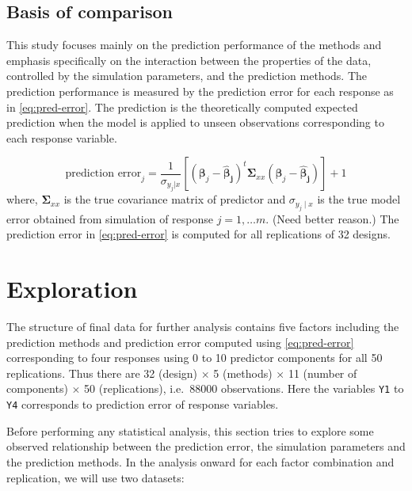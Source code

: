 \documentclass[12pt,3p,authoryear]{elsarticle}
\begin{document}
\hypertarget{basis-of-comparison}{%
\subsection{Basis of comparison}\label{basis-of-comparison}}

This study focuses mainly on the prediction performance of the methods
and emphasis specifically on the interaction between the properties of
the data, controlled by the simulation parameters, and the prediction
methods. The prediction performance is measured by the prediction error
for each response as in \eqref{eq:pred-error}. The prediction is the
theoretically computed expected prediction when the model is applied to
unseen observations corresponding to each response variable.

\begin{equation}
\text{prediction error}_j = \frac{1}{\sigma_{y_j|x}}\left[\left(\boldsymbol{\beta}_j - \boldsymbol{\hat{\beta}_j}\right)^t\boldsymbol{\Sigma}_{xx}\left(\boldsymbol{\beta}_j - \boldsymbol{\hat{\beta}_j}\right)\right] + 1
\label{eq:pred-error}
\end{equation} where, \(\boldsymbol{\Sigma}_{xx}\) is the true
covariance matrix of predictor and \(\sigma_{y_j\mid x}\) is the true
model error obtained from simulation of response \(j = 1, \ldots m\).
(\alert{Need better reason.}) The prediction error in
\eqref{eq:pred-error} is computed for all replications of 32 designs.

\hypertarget{exploration}{%
\section{Exploration}\label{exploration}}

The structure of final data for further analysis contains five factors
including the prediction methods and prediction error computed using
\eqref{eq:pred-error} corresponding to four responses using 0 to 10
predictor components for all 50 replications. Thus there are 32 (design)
\(\times\) 5 (methods) \(\times\) 11 (number of components) \(\times\)
50 (replications), i.e.~88000 observations. Here the variables
\texttt{Y1} to \texttt{Y4} corresponds to prediction error of response
variables.

Before performing any statistical analysis, this section tries to
explore some observed relationship between the prediction error, the
simulation parameters and the prediction methods. In the analysis onward
for each factor combination and replication, we will use two datasets:
\end{document}
